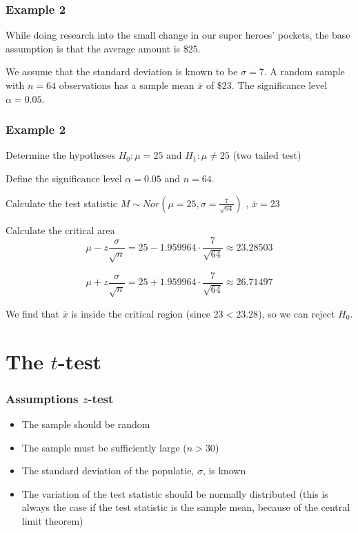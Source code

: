 \documentclass{beamer}
\begin{document}
\begin{frame}
  \frametitle{Example 2}
  While doing research into the small change in our super heroes' pockets, the base assumption is that the average amount is \$25.
  
  We assume that the standard deviation is known to be $\sigma = 7$. A random sample with $n=64$ observations has a sample mean $\overline{x}$ of \$23. The significance level $\alpha = 0.05$.
\end{frame}

\begin{frame}
  \frametitle{Example 2}
  \begin{block}{Determine the hypotheses}
  $H_{0} : \mu = 25$ and $H_{1}: \mu \neq 25$ (two tailed test)
  \end{block}

  \begin{block}{Define the significance level}
  $\alpha = 0.05$ and $n=64$.
  \end{block}

  \begin{block}{Calculate the test statistic}
    $M \sim Nor(\mu = 25, \sigma = \frac{7}{\sqrt{64}})$ , $\overline{x} = 23$
  \end{block}
\end{frame}

\begin{frame}
  \begin{block}{Calculate the critical area}
    \[ \mu - z \frac{\sigma}{\sqrt{n}} = 25 - 1.959964 \cdot \frac{7}{\sqrt{64}} \approx 23.28503 \]
    
    \[ \mu + z \frac{\sigma}{\sqrt{n}} = 25 + 1.959964 \cdot \frac{7}{\sqrt{64}} \approx 26.71497 \]
    
    We find that $\overline{x}$ is inside the critical region (since $23 < 23.28$), so we can reject $H_{0}$.
  \end{block}

\end{frame}

\section{The $t$-test}
\sectionframelogo{}

\begin{frame}
  \frametitle{Assumptions $z$-test}
  
  
  \begin{itemize}
    \item The sample should be random
    \item The sample must be sufficiently large ($n > 30$)
    \item The standard deviation of the populatie, $\sigma$, is known
    \item The variation of the test statistic should be normally distributed (this is always the case if the test statistic is the sample mean, because of the central limit theorem)
  \end{itemize}

\end{frame}
\end{document}
